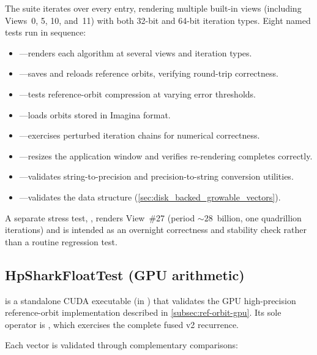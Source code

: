 The suite iterates over every  entry, rendering
multiple built-in views (including Views~0, 5, 10, and~11) with both
32-bit and 64-bit iteration types.  Eight named tests run in sequence:

\begin{itemize}
  \item {}---renders each algorithm at several views and
        iteration types.
  \item {}---saves and reloads reference orbits,
        verifying round-trip correctness.
  \item {}---tests reference-orbit compression
        at varying error thresholds.
  \item {}---loads orbits stored in Imagina format.
  \item {}---exercises perturbed iteration
        chains for numerical correctness.
  \item {}---resizes the application window and
        verifies re-rendering completes correctly.
  \item {}---validates string-to-precision and
        precision-to-string conversion utilities.
  \item {}---validates the
         data structure
        (\cref{sec:disk_backed_growable_vectors}).
\end{itemize}

\noindent
A separate stress test, , renders View~\#27
(period ${\sim}28$~billion, one quadrillion iterations) and is intended
as an overnight correctness and stability check rather than a routine
regression test.

\subsection{HpSharkFloatTest (GPU arithmetic)}
\label{subsec:hpsharkfloattest}

 is a standalone CUDA executable (in
) that validates the GPU high-precision
reference-orbit implementation described in \cref{subsec:ref-orbit-gpu}.
Its sole operator is , which exercises the complete
fused v2 recurrence.

Each vector is validated through complementary comparisons:

